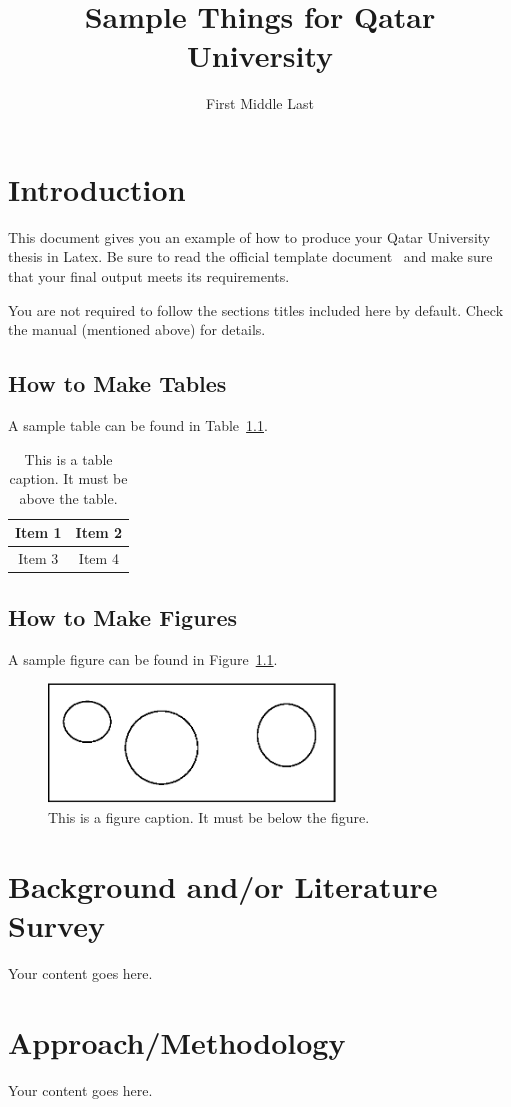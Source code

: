 \documentclass[12pt,lot,lof]{quthesis}
\title{Sample Things for Qatar University}
\author{First Middle Last} %
\begin{document}
\makefrontmatter

\chapter{Introduction}
This document gives you an example of how to produce your Qatar 
University thesis in Latex.  Be sure to read the 
official template document~\cite{qutemp} and make sure that your
final output meets its requirements.

You are not required to follow the sections titles included here by default.
Check the manual (mentioned above) for details.

\section{How to Make Tables}
A sample table can be found in Table~\ref{tab:example}.
\begin{table}[t]
\centering
\caption{This is a table caption.  It must be above the table.}
\begin{tabular}{|c|c|}
\hline
Item 1 & Item 2 \\
\hline
Item 3 & Item 4 \\
\hline
\end{tabular}
\label{tab:example}
\end{table}

\section{How to Make Figures}
A sample figure can be found in Figure~\ref{fig:example}.
\begin{figure}[t]
\centering
\includegraphics[width=3in]{samplefig.eps}
\caption{This is a figure caption.  It must be below the figure.}
\label{fig:example}
\end{figure}

\chapter{Background and/or Literature Survey}
Your content goes here.

\chapter{Approach/Methodology}
Your content goes here.
\end{document}

